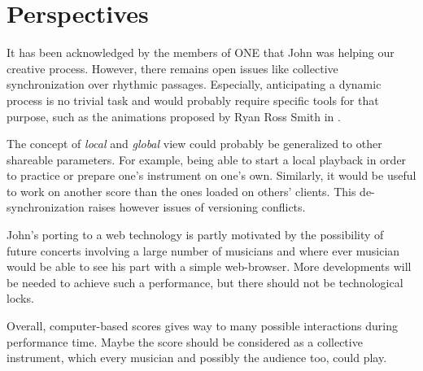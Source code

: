 \section{Perspectives}

It has been acknowledged by the members of ONE that John was helping our creative process. However, there remains open issues like collective synchronization over rhythmic passages. Especially, anticipating a dynamic process is no trivial task and would probably require specific tools for that purpose, such as the animations proposed by Ryan Ross Smith in \cite{smith_atomic_2015}.

The concept of \textit{local} and \textit{global} view could probably be generalized to other shareable parameters. For example, being able to start a local playback in order to practice or prepare one's instrument on one's own. Similarly, it would be useful to work on another score than the ones loaded on others' clients. This de-synchronization raises however issues of versioning conflicts.

John's porting to a web technology is partly motivated by the possibility of future concerts involving a large number of musicians and where ever musician would be able to see his part with a simple web-browser. More developments will be needed to achieve such a performance, but there should not be technological locks.

Overall, computer-based scores gives way to many possible interactions during performance time. Maybe the score should be considered as a collective instrument,  which every musician and possibly the audience too, could play.
